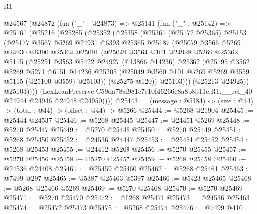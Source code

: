 \begin{lexlean}{R1}
\begin{coremodule}
  @24567
    (@24872
      (fun ("_" : @24873) =>
      @25141
        (fun ("_" : @25142) =>
        @25161
          (@25216
            (@25285
              (@25352
                (@25358
                  (@25361
                    (@25172 @25365)
                    @25153
                    (@25177
                      @3567
                      @5269
                      @24931
                      @6393
                      @25365
                      @25187
                      (@25079
                        @3566
                        @5269
                        @24930
                        @6390
                        @25364
                        @25091
                        (@25049
                          @3564
                          @101
                          @24928
                          @5269
                          @25362
                          @5115
                          (@25251
                            @3563
                            @5422
                            @24927
                            (@13866 @14236)
                            @25362
                            (@25195
                              @3562
                              @5269
                              @5271
                              @6151
                              @14236
                              @25205
                              (@25049 @3560 @101 @5269 @5269 @3559 @5115 (@25100 @3559) @25103))
                            (@25275 @120))
                          @25103)))
                    (@25213 @24925))
                  @25103))))
          (LexLeanPreserve.C59da78af981c7e10f46266c8a8b8b11e.R1.__rel_40
            @24944
            @24946
            @24948
            @24950))))
@25443 := (message : @5384) -> (size : @44) -> (total : @44) -> (offset : @44) -> @5266
@25444 := @5268 @21904
@25445 := @25444 @24537
@25446 := @5268 @25445
@25447 := @24451 @5269
@25448 := @5270 @25447
@25449 := @5270 @25448
@25450 := @5270 @25449
@25451 := @5268 @25450
@25452 := @24536 @24447
@25453 := @25451 @25452
@25454 := @5268 @25453
@25455 := @24412 @5269
@25456 := @5270 @25455
@25457 := @5270 @25456
@25458 := @5270 @25457
@25459 := @5268 @25458
@25460 := @24536 @24408
@25461 := @25459 @25460
@25462 := @5268 @25461
@25463 := @7499 @297
@25465 := @5387 @25463 @5397
@25466 := @5423 @25465
@25468 := @5268 @25466 @5269
@25469 := @5270 @25468
@25470 := @5270 @25469
@25471 := @5270 @25470
@25472 := @5268 @25471
@25473 := @24536 @25463
@25474 := @25472 @25473
@25475 := @5268 @25474
@25476 := @7499 @410

\end{coremodule}
\end{lexlean}
